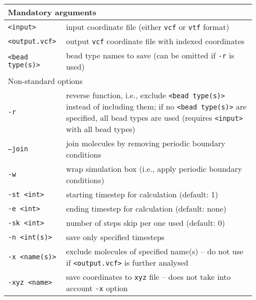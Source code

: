 \vspace{1em}
\noindent
\begin{longtable}{p{}p{}}
  \toprule
  \multicolumn{2}{l}{Mandatory arguments} \\
  \midrule
  \texttt{<input>} & input coordinate file (either \texttt{vcf} or
    \texttt{vtf} format) \\
  \texttt{<output.vcf>} & output \texttt{vcf} coordinate file with indexed
    coordinates \\
  \texttt{<bead type(s)>} & bead type names to save (can be omitted if
    \texttt{-r} is used) \\
  \toprule
  \multicolumn{2}{l}{Non-standard options} \\
  \midrule
  \texttt{-r} & reverse function, i.e., exclude \texttt{<bead type(s)>}
    instead of including them; if no \texttt{<bead type(s)>} are specified,
    all bead types are used (requires \texttt{<input>} with all bead types) \\
  \texttt{--join} & join molecules by removing periodic boundary conditions \\
  \texttt{-w} & wrap simulation box (i.e., apply periodic boundary conditions) \\
  \texttt{-st <int>} & starting timestep for calculation (default: 1) \\
  \texttt{-e <int>} & ending timestep for calculation (default: none) \\
  \texttt{-sk <int>} & number of steps skip per one used (default: 0) \\
  \texttt{-n <int(s)>} & save only specified timesteps \\
  \texttt{-x <name(s)>} & exclude molecules of specified name(s) -- do not
    use if \texttt{<output.vcf>} is further analysed \\
  \texttt{-xyz <name>} & save coordinates to \texttt{xyz} file -- does not
    take into account \texttt{-x} option \\
  \bottomrule
\end{longtable}
